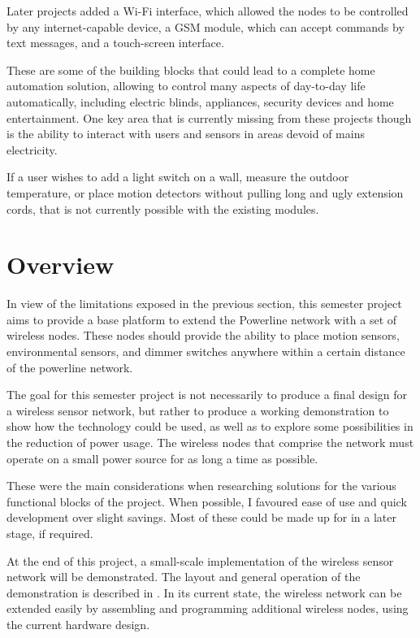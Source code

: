 Later projects added a Wi-Fi interface\cite{sallin2010}, which allowed the nodes
to be controlled by any internet-capable device, a GSM module\cite{sallin2010},
which can accept commands by text messages, and a touch-screen interface.

These are some of the building blocks that could lead to a complete home
automation solution, allowing to control many aspects of day-to-day life
automatically, including electric blinds, appliances, security devices and home
entertainment.  One key area that is currently missing from these projects
though is the ability to interact with users and sensors in areas devoid of
mains electricity.

If a user wishes to add a light switch on a wall, measure the outdoor
temperature, or place motion detectors without pulling long and ugly extension
cords, that is not currently possible with the existing modules.

\pagebreak
\section{Overview}
In view of the limitations exposed in the previous section, this semester
project aims to provide a base platform to extend the Powerline network with a
set of wireless nodes. These nodes should provide the ability to place motion
sensors, environmental sensors, and dimmer switches anywhere within a certain
distance of the powerline network. 


The goal for this semester project is not necessarily to produce a final design
for a wireless sensor network, but rather to produce a working demonstration to
show how the technology could be used, as well as to explore some possibilities
in the reduction of power usage.  The wireless nodes that comprise the network
must operate on a small power source for as long a time as possible.

These were the main considerations when researching solutions for the various
functional blocks of the project. When possible, I favoured ease of use and
quick development over slight savings. Most of these could be made up for in a
later stage, if required.

At the end of this project, a small-scale implementation of the wireless sensor
network will be demonstrated. The layout and general operation of the
demonstration is described in . In its current state,
the wireless network can be extended easily by assembling and programming
additional wireless nodes, using the current hardware design.


